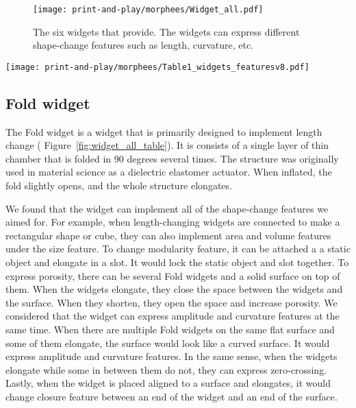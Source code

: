     \begin{figure}[htb]
      \centering
      \texttt{[image: print-and-play/morphees/Widget\_all.pdf]}
      \caption{The six widgets that \mp provide. The widgets can express
        different shape-change features such as length, curvature, etc.}
      \label{fig:widget_all}
    \end{figure}
        
    \begin{figure*}[htb]
      \centering
      \texttt{[image: print-and-play/morphees/Table1\_widgets\_featuresv8.pdf]}
      \caption{Top: Widgets provided by MorpheesPlug. Left: shape-change
        features from literature \cite{Roudaut:2013kz, 10.1145/3173574.3174193}.
        Middle: Illustrations of how the widgets can express the shape-change
        features.}
      \label{fig:widget_all_table}
    \end{figure*}
    
    \subsection{Fold widget}
      The Fold widget is a widget that is primarily designed to implement
      length change ( Figure~\ref{fig:widget_all_table}).  It is consists of a
      single layer of thin chamber that is folded in 90 degrees several times.
      The structure was originally used in material science \cite{Carpi_2007}
      as a dielectric elastomer actuator. When inflated, the fold slightly
      opens, and the whole structure elongates.
        
      We found that the widget can implement all of the shape-change features
      we aimed for. For example, when length-changing widgets are connected to
      make a rectangular shape or cube, they can also implement area and
      volume features under the size feature.  To change modularity feature,
      it can be attached a a static object and elongate in a slot. It would
      lock the static object and slot together.  To express porosity, there
      can be several Fold widgets and a solid surface on top of them. When the
      widgets elongate, they close the space between the widgets and the
      surface. When they shorten, they open the space and increase porosity.
      We considered that the widget can express amplitude and curvature
      features at the same time. When there are multiple Fold widgets on the
      same flat surface and some of them elongate, the surface would look like
      a curved surface. It would express amplitude and curvature features.  In
      the same sense, when the widgets elongate while some in between them do
      not, they can express zero-crossing.  Lastly, when the widget is placed
      aligned to a surface and elongates, it would change closure feature
      between an end of the widget and an end of the surface.
        
